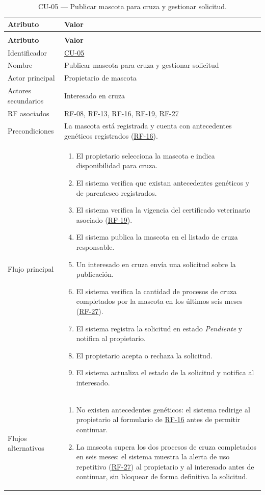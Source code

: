 \documentclass[journal,onecolumn]{IEEEtran}
\makeatletter
\newenvironment{atributos}[2]{%
	\small
	\begin{longtable}{@{}>{\raggedright\arraybackslash}p{4.2cm} >{\raggedright\arraybackslash}p{11.2cm}@{}}
		\caption{#2}\label{tab:#1}\\
		\toprule
		\textbf{Atributo} & \textbf{Valor} \\
		\midrule
		\endfirsthead
		\multicolumn{2}{@{}l}{\small\itshape (continuación)}\\
		\toprule
		\textbf{Atributo} & \textbf{Valor} \\
		\midrule
		\endhead
		\bottomrule
		\endlastfoot
	}{%
	\end{longtable}
	\normalsize
}
\makeatother
\begin{document}
	\begin{atributos}{CU-05}{CU-05 --- Publicar mascota para cruza y gestionar solicitud.}
		Identificador & \hyperref[tab:CU-05]{CU-05} \\
		Nombre & Publicar mascota para cruza y gestionar solicitud \\
		Actor principal & Propietario de mascota \\
		Actores secundarios & Interesado en cruza \\
		RF asociados & \hyperref[tab:RF-08]{RF-08}, \hyperref[tab:RF-13]{RF-13}, \hyperref[tab:RF-16]{RF-16}, \hyperref[tab:RF-19]{RF-19}, \hyperref[tab:RF-27]{RF-27} \\
		Precondiciones & La mascota está registrada y cuenta con antecedentes genéticos registrados (\hyperref[tab:RF-16]{RF-16}). \\
		Flujo principal &
		\begin{enumerate}[leftmargin=*, nosep]
			\item El propietario selecciona la mascota e indica disponibilidad para cruza.
			\item El sistema verifica que existan antecedentes genéticos y de parentesco registrados.
			\item El sistema verifica la vigencia del certificado veterinario asociado (\hyperref[tab:RF-19]{RF-19}).
			\item El sistema publica la mascota en el listado de cruza responsable.
			\item Un interesado en cruza envía una solicitud sobre la publicación.
			\item El sistema verifica la cantidad de procesos de cruza completados por la mascota en los últimos seis meses (\hyperref[tab:RF-27]{RF-27}).
			\item El sistema registra la solicitud en estado \emph{Pendiente} y notifica al propietario.
			\item El propietario acepta o rechaza la solicitud.
			\item El sistema actualiza el estado de la solicitud y notifica al interesado.
		\end{enumerate} \\
		Flujos alternativos &
		\begin{enumerate}[leftmargin=*, nosep]
			\item[2.1] No existen antecedentes genéticos: el sistema redirige al propietario al formulario de \hyperref[tab:RF-16]{RF-16} antes de permitir continuar.
			\item[6.1] La mascota supera los dos procesos de cruza completados en seis meses: el sistema muestra la alerta de uso repetitivo (\hyperref[tab:RF-27]{RF-27}) al propietario y al interesado antes de continuar, sin bloquear de forma definitiva la solicitud.

\end{enumerate}
\end{atributos}
\end{document}
